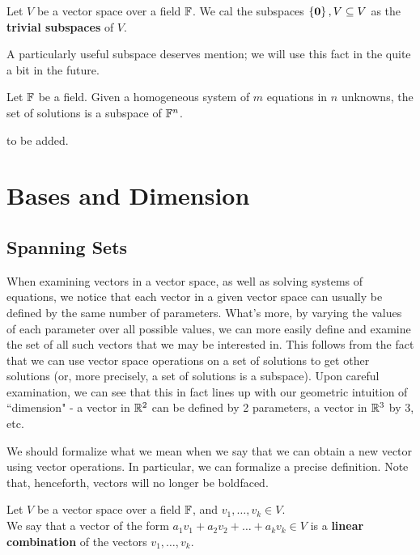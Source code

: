 \documentclass{article}
\begin{document}
\begin{crll}
Let $ V $ be a vector space over a field $ \mathbb{F} $. We cal the subspaces $ \left\{{\mathbf{0}}\right\}, V \subseteq V $ as the \textbf{trivial subspaces} of $ V $.
\end{crll}

A particularly useful subspace deserves mention; we will use this fact in the quite a bit in the future.

\begin{thm}
Let $ \mathbb{F} $ be a field. Given a homogeneous system of $ m $ equations in $ n $ unknowns, the set of solutions is a subspace of $ \mathbb{F}^{n} $.
\end{thm}

\begin{pf}
to be added.
\end{pf}

\newpage
\section{Bases and Dimension}
\subsection{Spanning Sets}

When examining vectors in a vector space, as well as solving systems of equations, we notice that each vector in a given vector space can usually be defined by the same number of parameters.
What's more, by varying the values of each parameter over all possible values, we can more easily define and examine the set of all such vectors that we may be interested in.
This follows from the fact that we can use vector space operations on a set of solutions to get other solutions (or, more precisely, a set of solutions is a subspace).
Upon careful examination, we can see that this in fact lines up with our geometric intuition of ``dimension" - a vector in $ \mathbb{R}^{2} $ can be defined by 2 parameters, a vector in $ \mathbb{R}^{3} $ by 3, etc. \npgh

We should formalize what we mean when we say that we can obtain a new vector using vector operations. In particular, we can formalize a precise definition. \vsp
Note that, henceforth, vectors will no longer be boldfaced.

\begin{defn}
Let $ V $ be a vector space over a field $ \mathbb{F} $, and $ v_{1}, \dots, v_{k} \in V $. \\
We say that a vector of the form $ a_{1}v_{1} + a_{2}v_{2} + \dots + a_{k}v_{k} \in V $ is a \textbf{linear combination} of the vectors $ v_{1}, \dots, v_{k} $.
\end{defn}
\end{document}
